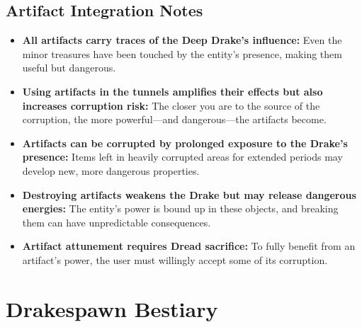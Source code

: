 \documentclass[11pt]{article}
\begin{document}
\subsection{Artifact Integration Notes}
\begin{itemize}
\item \textbf{All artifacts carry traces of the Deep Drake's influence:} Even the minor treasures have been touched by the entity's presence, making them useful but dangerous.
\item \textbf{Using artifacts in the tunnels amplifies their effects but also increases corruption risk:} The closer you are to the source of the corruption, the more powerful—and dangerous—the artifacts become.
\item \textbf{Artifacts can be corrupted by prolonged exposure to the Drake's presence:} Items left in heavily corrupted areas for extended periods may develop new, more dangerous properties.
\item \textbf{Destroying artifacts weakens the Drake but may release dangerous energies:} The entity's power is bound up in these objects, and breaking them can have unpredictable consequences.
\item \textbf{Artifact attunement requires Dread sacrifice:} To fully benefit from an artifact's power, the user must willingly accept some of its corruption.
\end{itemize}


\section{Drakespawn Bestiary}
\end{document}
